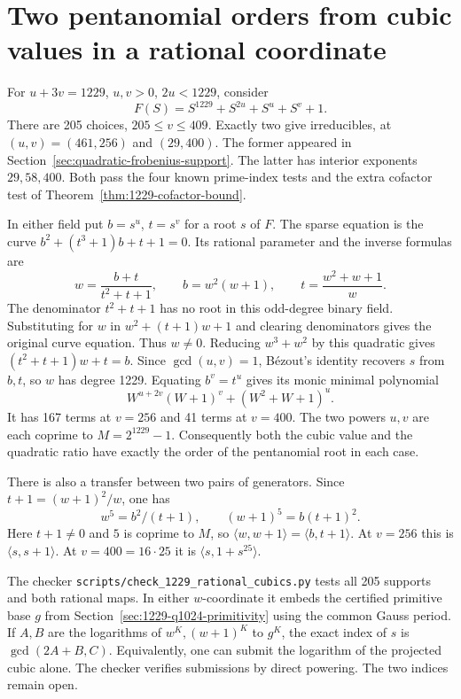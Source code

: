 \documentclass[11pt]{article}
\begin{document}
\section{Two pentanomial orders from cubic values in a rational coordinate}
\label{sec:rational-cubics}
For \(u+3v=1229\), \(u,v>0\), \(2u<1229\), consider
\[
       F(S)=S^{1229}+S^{2u}+S^u+S^v+1 .
\]
There are 205 choices, \(205\le v\le409\). Exactly two give
irreducibles, at \((u,v)=(461,256)\) and \((29,400)\). The former
appeared in Section~\ref{sec:quadratic-frobenius-support}.
The latter has interior exponents \(29,58,400\). Both pass the four
known prime-index tests and the extra cofactor test of
Theorem~\ref{thm:1229-cofactor-bound}.

In either field put \(b=s^u\), \(t=s^v\) for a root \(s\) of \(F\).
The sparse equation is the curve \(b^2+(t^3+1)b+t+1=0\).
Its rational parameter and the inverse formulas are
\[
   w=\frac{b+t}{t^2+t+1},\qquad
   b=w^2(w+1),\qquad t=\frac{w^2+w+1}{w}.
\]
The denominator \(t^2+t+1\) has no root in this odd-degree binary field.
Substituting for \(w\) in \(w^2+(t+1)w+1\) and clearing denominators
gives the original curve equation. Thus \(w\ne0\). Reducing \(w^3+w^2\)
by this quadratic gives \((t^2+t+1)w+t=b\). Since \(\gcd(u,v)=1\),
Bézout's identity recovers \(s\) from \(b,t\), so \(w\) has degree
1229. Equating \(b^v=t^u\) gives its monic minimal polynomial
\[
        W^{u+2v}(W+1)^v+(W^2+W+1)^u .
\]
It has 167 terms at \(v=256\) and 41 terms at \(v=400\).
The two powers \(u,v\) are each coprime to \(M=2^{1229}-1\).
Consequently both the cubic value and the quadratic ratio have
exactly the order of the pentanomial root in each case.

There is also a transfer between two pairs of generators. Since
\(t+1=(w+1)^2/w\), one has
\[
           w^5=b^2/(t+1),\qquad (w+1)^5=b(t+1)^2 .
\]
Here \(t+1\ne0\) and \(5\) is coprime to \(M\), so
\(\langle w,w+1\rangle=\langle b,t+1\rangle\). At \(v=256\) this
is \(\langle s,s+1\rangle\). At \(v=400=16\cdot25\) it is
\(\langle s,1+s^{25}\rangle\).

The checker \nolinkurl{scripts/check_1229_rational_cubics.py} tests all
205 supports and both rational maps. In either \(w\)-coordinate it
embeds the certified primitive base \(g\) from
Section~\ref{sec:1229-q1024-primitivity} using the common Gauss period.
If \(A,B\) are the logarithms of \(w^K,(w+1)^K\) to \(g^K\), the exact
index of \(s\) is \(\gcd(2A+B,C)\). Equivalently, one can submit the
logarithm of the projected cubic alone. The checker verifies submissions
by direct powering. The two indices remain open.
\end{document}
